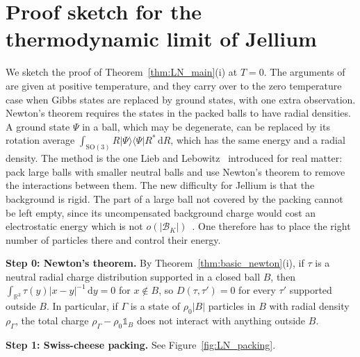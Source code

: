 \documentclass[final,reqno]{amsart}
\theoremstyle{remark}
\theoremstyle{definition}
\newcommand{\RR}{\mathbb{R}}
\newcommand{\iden}{\mathbb{1}}
\newcommand{\SO}{\mathrm{SO}}
\begin{document}
\section{Proof sketch for the thermodynamic limit of Jellium}\label{sec:LN_proof}

We sketch the proof of Theorem~\ref{thm:LN_main}(i) at $T=0$. The arguments of~\cite{lieb1975thermodynamic} are given at positive temperature, and they carry over to the zero temperature case when Gibbs states are replaced by ground states, with one extra observation. Newton's theorem requires the states in the packed balls to have radial densities. A ground state $\Psi$ in a ball, which may be degenerate, can be replaced by its rotation average $\int_{\SO(3)}R|\Psi\rangle\langle\Psi|R^*\,\mathrm{d}R$, which has the same energy and a radial density. The method is the one Lieb and Lebowitz~\cite{lieb1972constitution} introduced for real matter: pack large balls with smaller neutral balls and use Newton's theorem to remove the interactions between them. The new difficulty for Jellium is that the background is rigid. The part of a large ball not covered by the packing cannot be left empty, since its uncompensated background charge would cost an electrostatic energy which is not $o(|\mathcal B_K|)$~\cite[Sec.~3.1]{lieb1975thermodynamic}. One therefore has to place the right number of particles there and control their energy.

\medskip

\noindent\textbf{Step 0: Newton's theorem.} By Theorem~\ref{thm:basic_newton}(i), if $\tau$ is a neutral radial charge distribution supported in a closed ball $B$, then $\int_{\RR^3}\tau(y)|x-y|^{-1}\,\mathrm dy=0$ for $x\notin B$, so $D(\tau,\tau')=0$ for every $\tau'$ supported outside $B$. In particular, if $\Gamma$ is a state of $\rho_0|B|$ particles in $B$ with radial density $\rho_\Gamma$, the total charge $\rho_\Gamma-\rho_0\iden_B$ does not interact with anything outside $B$.

\medskip

\noindent\textbf{Step 1: Swiss-cheese packing.} See Figure~\ref{fig:LN_packing}.
\end{document}
